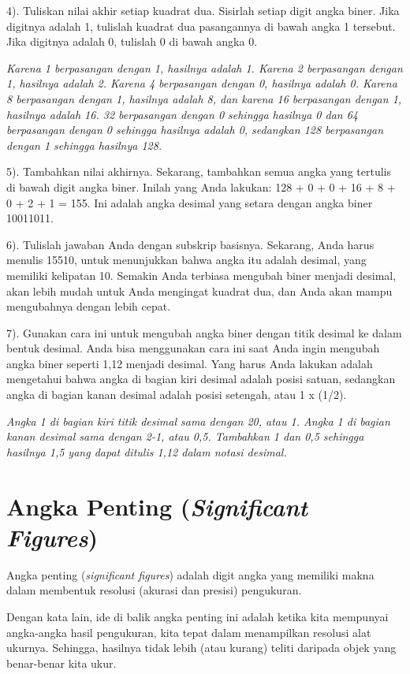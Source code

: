 \documentclass{article}
\begin{document}
4). Tuliskan nilai akhir setiap kuadrat dua. Sisirlah setiap digit angka biner. Jika digitnya adalah 1, tulislah kuadrat dua pasangannya di bawah angka 1 tersebut. Jika digitnya adalah 0, tulislah 0 di bawah angka 0.

\textit{Karena 1 berpasangan dengan 1, hasilnya adalah 1. Karena 2 berpasangan dengan 1, hasilnya adalah 2. Karena 4 berpasangan dengan 0, hasilnya adalah 0. Karena 8 berpasangan dengan 1, hasilnya adalah 8, dan karena 16 berpasangan dengan 1, hasilnya adalah 16. 32 berpasangan dengan 0 sehingga hasilnya 0 dan 64 berpasangan dengan 0 sehingga hasilnya adalah 0, sedangkan 128 berpasangan dengan 1 sehingga hasilnya 128.}

5). Tambahkan nilai akhirnya. Sekarang, tambahkan semua angka yang tertulis di bawah digit angka biner. Inilah yang Anda lakukan: 128 + 0 + 0 + 16 + 8 + 0 + 2 + 1 = 155. Ini adalah angka desimal yang setara dengan angka biner 10011011.

6). Tulislah jawaban Anda dengan subskrip basisnya. Sekarang, Anda harus menulis 15510, untuk menunjukkan bahwa angka itu adalah desimal, yang memiliki kelipatan 10. Semakin Anda terbiasa mengubah biner menjadi desimal, akan lebih mudah untuk Anda mengingat kuadrat dua, dan Anda akan mampu mengubahnya dengan lebih cepat.

7). Gunakan cara ini untuk mengubah angka biner dengan titik desimal ke dalam bentuk desimal. Anda bisa menggunakan cara ini saat Anda ingin mengubah angka biner seperti 1,12 menjadi desimal. Yang harus Anda lakukan adalah mengetahui bahwa angka di bagian kiri desimal adalah posisi satuan, sedangkan angka di bagian kanan desimal adalah posisi setengah, atau 1 x (1/2).

\textit{Angka 1 di bagian kiri titik desimal sama dengan 20, atau 1. Angka 1 di bagian kanan desimal sama dengan 2-1, atau 0,5. Tambahkan 1 dan 0,5 sehingga hasilnya 1,5 yang dapat ditulis 1,12 dalam notasi desimal.}

\section*{Angka Penting (\textit{Significant Figures})}

Angka penting (\textit{significant figures}) adalah digit angka yang memiliki makna dalam membentuk resolusi (akurasi dan presisi) pengukuran.

Dengan kata lain, ide di balik angka penting ini adalah ketika kita mempunyai angka-angka hasil pengukuran, kita tepat dalam menampilkan resolusi alat ukurnya. Sehingga, hasilnya tidak lebih (atau kurang) teliti daripada objek yang benar-benar kita ukur.
\end{document}
